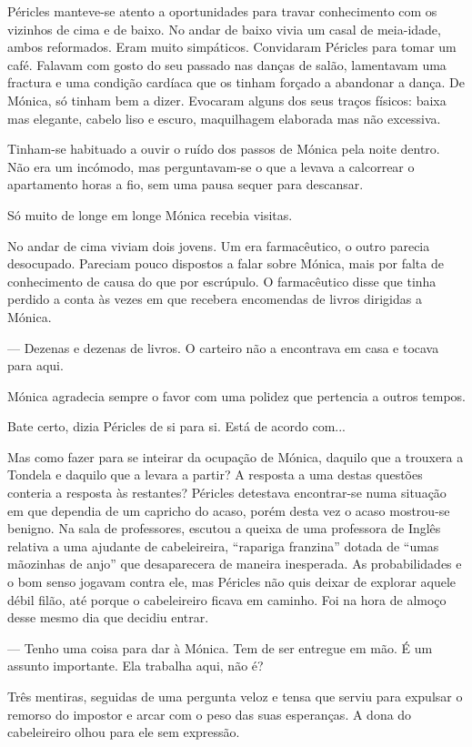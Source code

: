 Péricles manteve-se atento a oportunidades para travar conhecimento com
os vizinhos de cima e de baixo. No andar de baixo vivia um casal de
meia-idade, ambos reformados. Eram muito simpáticos. Convidaram Péricles
para tomar um café. Falavam com gosto do seu passado nas danças de
salão, lamentavam uma fractura e uma condição cardíaca que os tinham
forçado a abandonar a dança. De Mónica, só tinham bem a dizer. Evocaram
alguns dos seus traços físicos: baixa mas elegante, cabelo liso e
escuro, maquilhagem elaborada mas não excessiva.

Tinham-se habituado a ouvir o ruído dos passos de Mónica pela noite
dentro. Não era um incómodo, mas perguntavam-se o que a levava a
calcorrear o apartamento horas a fio, sem uma pausa sequer para
descansar.

Só muito de longe em longe Mónica recebia visitas.

No andar de cima viviam dois jovens. Um era farmacêutico, o outro
parecia desocupado. Pareciam pouco dispostos a falar sobre Mónica, mais
por falta de conhecimento de causa do que por escrúpulo. O farmacêutico
disse que tinha perdido a conta às vezes em que recebera encomendas de
livros dirigidas a Mónica.

--- Dezenas e dezenas de livros. O carteiro não a encontrava em casa e
tocava para aqui.

Mónica agradecia sempre o favor com uma polidez que pertencia a outros
tempos.

Bate certo, dizia Péricles de si para si. Está de acordo com...

Mas como
fazer para se inteirar da ocupação de Mónica, daquilo que a trouxera a
Tondela e daquilo que a levara a partir? A resposta a uma destas
questões conteria a resposta às
restantes? Péricles detestava encontrar-se numa situação em que dependia
de um capricho do acaso, porém desta vez o acaso mostrou-se benigno. Na
sala de professores, escutou a queixa de uma professora de Inglês
relativa a uma ajudante de cabeleireira, ``rapariga franzina'' dotada de
``umas mãozinhas de anjo'' que desaparecera de maneira inesperada. As
probabilidades e o bom senso jogavam contra ele, mas Péricles não quis
deixar de explorar aquele débil filão, até porque o cabeleireiro
ficava em caminho. Foi na hora de almoço desse mesmo dia que decidiu
entrar.

--- Tenho uma coisa para dar à Mónica. Tem de ser entregue em mão. É um
  assunto importante. Ela trabalha aqui, não é?


Três mentiras, seguidas de uma pergunta veloz e tensa que serviu para
expulsar o remorso do impostor e arcar com o peso das suas esperanças. A
dona do cabeleireiro olhou para ele sem expressão.

